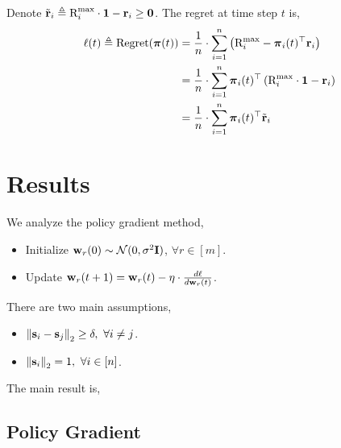 \documentclass[10pt]{article}
\begin{document}
Denote ${\tilde{\mathbf{r}}}_{i} \triangleq {\text{R}}_i^{\max} \cdot {\mathbf{1}} -  {\mathbf{r}}_{i} \ge {\mathbf{0}}$. The regret at time step $t$ is,
\begin{equation*}
\begin{split}
	\ell(t) \triangleq {\text{Regret}}({\boldsymbol{\pi}}(t)) &= \frac{1}{n} \cdot \sum\limits_{i=1}^{n}{ \left( {\text{R}}_i^{\max} - {\boldsymbol{\pi}}_{i}(t)^\top {\mathbf{r}}_i \right) } \\
	&= \frac{1}{n} \cdot \sum\limits_{i=1}^{n}{ {\boldsymbol{\pi}}_{i}(t)^\top \left( {\text{R}}_i^{\max} \cdot {\mathbf{1}} - {\mathbf{r}}_{i} \right) } \\
	&= \frac{1}{n} \cdot \sum\limits_{i=1}^{n}{ {\boldsymbol{\pi}}_{i}(t)^\top {\tilde{\mathbf{r}}}_{i} }
\end{split}
\end{equation*}

\section{Results}
We analyze the policy gradient method,

\begin{itemize}
	\item Initialize ${\mathbf{w}}_r(0) \sim {\mathcal{N}}(0, \sigma^2 {\mathbf{I}})$, $\forall r \in [m]$.
	\item Update ${\mathbf{w}}_r(t+1) = {\mathbf{w}}_r(t) - \eta \cdot \frac{d\ell}{d {\mathbf{w}}_r(t)}$.
\end{itemize}

There are two main assumptions,

\begin{itemize}
	\item $\left\| {\mathbf{s}}_{i} -  {\mathbf{s}}_{j} \right\|_2 \ge \delta, \ \forall i \not= j$.
	\item $\left\| \rvs_{i} \right\|_2 = 1, \ \forall i \in [n]$.
\end{itemize}

The main result is,
\begin{thm}
\end{thm}

\subsection{Policy Gradient}
\end{document}
